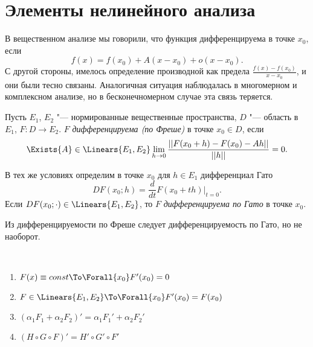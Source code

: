 \documentclass[main]{subfiles}
\begin{document}
\section{Элементы нелинейного анализа}%

В вещественном анализе мы говорили,
что функция дифференцируема в точке \( x_0 \), если
\[
  f(x) = f(x_0) + A (x - x_0) + o(x - x_0).
\]
С другой стороны, имелось определение производной
как предела \( \frac{f(x) - f(x_0)}{x - x_0} \),
и они были тесно связаны.
Аналогичная ситуация наблюдалась в многомерном
и комплексном анализе, но в бесконечномерном
случае эта связь теряется.

\begin{definition}
  Пусть \( E_1 \), \( E_2 \) "--- нормированные вещественные пространства,
  \( D \) "--- область в \( E_1 \), \( F: D \to E_2 \).
  \( F \) \emph{дифференцируема (по Фреше)} в точке \( x_0 \in D \),
  если
  \[
    \Exists{A} \in \Linears{E_1, E_2}
    \lim_{h \to 0} \frac{||F(x_0 + h) - F(x_0) - Ah||}{||h||} = 0.
  \]
\end{definition}

\begin{definition}
  В тех же условиях определим в точке \( x_0 \) для \( h \in E_1 \)
  дифференциал Гато
  \[
    DF(x_0; h) = \frac{d}{dt} F(x_0 + t h) \bigr|_{t=0}.
  \]
  Если \( DF(x_0; \cdot) \in \Linears{E_1, E_2} \),
  то \( F \) \emph{дифференцируема по Гато} в точке \( x_0 \).
\end{definition}

\begin{exercise}
  Из дифференцируемости по Фреше следует дифференцируемость по
  Гато, но не наоборот.
\end{exercise}

\begin{proposition}~
  \begin{enumerate}
    \item \( F(x) \equiv const \To \Forall{x_0} F'(x_0) = 0 \)
    \item \( F \in \Linears{E_1, E_2} \To
      \Forall{x_0} F'(x_0) = F(x_0) \)
    \item \( (\alpha_1 F_1 + \alpha_2 F_2)' =
      \alpha_1 F_1' + \alpha_2 F_2' \)
    \item \( (H \circ G \circ F)' = H' \circ G' \circ F' \)
  \end{enumerate}
\end{proposition}
\end{document}
